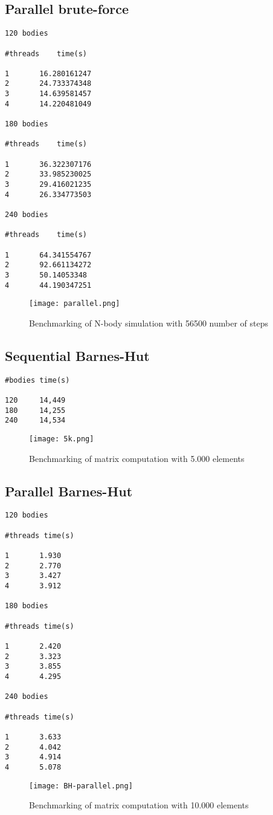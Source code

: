 \documentclass{article}
\begin{document}
\subsection{Parallel brute-force}
\begin{verbatim}
120 bodies

#threads    time(s)

1       16.280161247
2       24.733374348
3       14.639581457
4       14.220481049

180 bodies 

#threads    time(s)

1       36.322307176  
2       33.985230025  
3       29.416021235
4       26.334773503

240 bodies

#threads    time(s)

1       64.341554767 
2       92.661134272 
3       50.14053348 
4       44.190347251
\end{verbatim}
\begin{figure}[h]
\centering
\texttt{[image: parallel.png]}
\caption{Benchmarking of N-body simulation with 56500 number of steps}
\end{figure}      

\subsection{Sequential Barnes-Hut}
\begin{verbatim}
#bodies time(s)

120     14,449
180     14,255
240     14,534
\end{verbatim}
\begin{figure}[h]
\centering
\texttt{[image: 5k.png]}
\caption{Benchmarking of matrix computation with 5.000 elements}
\end{figure}      
\clearpage

\subsection{Parallel Barnes-Hut}
\begin{verbatim}
120 bodies

#threads time(s)

1       1.930
2       2.770
3       3.427
4       3.912

180 bodies

#threads time(s)

1       2.420
2       3.323
3       3.855
4       4.295

240 bodies

#threads time(s)

1       3.633
2       4.042
3       4.914
4       5.078
\end{verbatim}
\begin{figure}[h]
\centering
\texttt{[image: BH-parallel.png]}
\caption{Benchmarking of matrix computation with 10.000 elements}
\end{figure}
\end{document}

